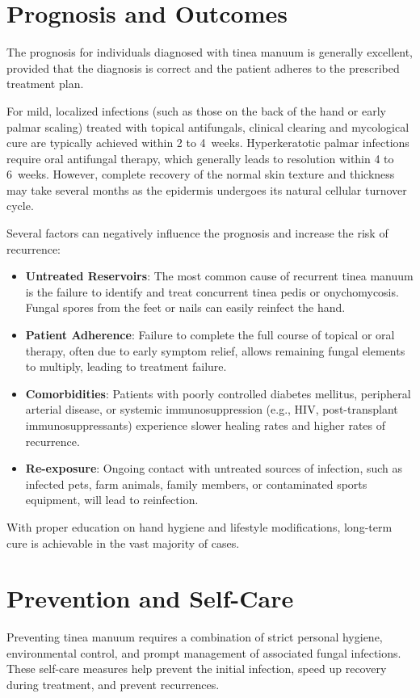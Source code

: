 \section*{Prognosis and Outcomes}
The prognosis for individuals diagnosed with tinea manuum is generally excellent, provided that the diagnosis is correct and the patient adheres to the prescribed treatment plan.

For mild, localized infections (such as those on the back of the hand or early palmar scaling) treated with topical antifungals, clinical clearing and mycological cure are typically achieved within 2 to 4~weeks. Hyperkeratotic palmar infections require oral antifungal therapy, which generally leads to resolution within 4 to 6~weeks. However, complete recovery of the normal skin texture and thickness may take several months as the epidermis undergoes its natural cellular turnover cycle.

Several factors can negatively influence the prognosis and increase the risk of recurrence:
\begin{itemize}
    \item \textbf{Untreated Reservoirs}: The most common cause of recurrent tinea manuum is the failure to identify and treat concurrent tinea pedis or onychomycosis. Fungal spores from the feet or nails can easily reinfect the hand.
    \item \textbf{Patient Adherence}: Failure to complete the full course of topical or oral therapy, often due to early symptom relief, allows remaining fungal elements to multiply, leading to treatment failure.
    \item \textbf{Comorbidities}: Patients with poorly controlled diabetes mellitus, peripheral arterial disease, or systemic immunosuppression (e.g., HIV, post-transplant immunosuppressants) experience slower healing rates and higher rates of recurrence.
    \item \textbf{Re-exposure}: Ongoing contact with untreated sources of infection, such as infected pets, farm animals, family members, or contaminated sports equipment, will lead to reinfection.
\end{itemize}
With proper education on hand hygiene and lifestyle modifications, long-term cure is achievable in the vast majority of cases.

\section*{Prevention and Self-Care}
Preventing tinea manuum requires a combination of strict personal hygiene, environmental control, and prompt management of associated fungal infections. These self-care measures help prevent the initial infection, speed up recovery during treatment, and prevent recurrences.

